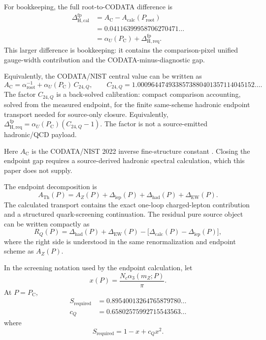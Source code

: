 \documentclass[11pt]{article}
\theoremstyle{remark}
\newcommand{\ATh}{A_{\mathrm{Th}}}
\newcommand{\AZ}{A_Z}
\newcommand{\Ppub}{P_{\mathrm C}}
\newcommand{\Rq}{R_Q}
\newcommand{\Dcalc}{\Delta_{\mathrm{calc}}}
\newcommand{\Dcalib}{\Delta_{\mathrm{H,cal}}}
\newcommand{\Dlep}{\Delta_{\mathrm{lep}}}
\newcommand{\Dhad}{\Delta_{\mathrm{had}}}
\newcommand{\DEW}{\Delta_{\mathrm{EW}}}
\newcommand{\Dhadreq}{\Delta_{\mathrm{H,req}}}
\newcommand{\Nc}{N_c}
\begin{document}
For bookkeeping, the full root-to-CODATA difference is
\begin{align}
\Dcalib^{\mathrm{fp}}
&=
A_{\mathrm C}-A_{\mathrm{calc}}(P_{\mathrm{root}})
\nonumber\\
&=
0.04116399958706270471\ldots
\nonumber\\
&=
\alpha_U(\Ppub)+\Dhadreq^{\mathrm{fp}}.
\label{eq:rootcodatafp}
\end{align}
This larger difference is bookkeeping: it contains the comparison-pixel unified gauge-width
contribution and the CODATA-minus-diagnostic gap.

Equivalently, the CODATA/NIST central value can be written as
\begin{equation}
A_{\mathrm C}
=
\alpha_{\mathrm{root}}^{-1}+\alpha_U(\Ppub)\,C_{24,Q},
\qquad
C_{24,Q}=1.0009644749338573880401357114045152\ldots.
\label{eq:c24qfactor}
\end{equation}
The factor \(C_{24,Q}\) is a back-solved calibration: compact comparison
accounting, solved from the measured endpoint, for the finite same-scheme hadronic endpoint
transport needed for source-only closure. Equivalently,
\(\Dhadreq^{\mathrm{fp}}=\alpha_U(\Ppub)(C_{24,Q}-1)\). The factor is not a source-emitted
hadronic/QCD payload.

Here \(A_{\mathrm C}\) is the CODATA/NIST 2022 inverse fine-structure constant \cite{nist-value,nist-2022}. Closing the endpoint gap requires a source-derived hadronic spectral calculation, which this paper does not supply.

The endpoint decomposition is
\begin{equation}
\ATh(P)
=
\AZ(P)+\Dlep(P)+\Dhad(P)+\DEW(P).
\label{eq:ATsplit}
\end{equation}
The calculated transport contains the exact one-loop charged-lepton contribution and a structured quark-screening continuation. The residual pure source object can be written compactly as
\begin{equation}
\Rq(P)
=
\Dhad(P)+\DEW(P)
-\bigl[\Dcalc(P)-\Dlep(P)\bigr],
\label{eq:RQmeaning}
\end{equation}
where the right side is understood in the same renormalization and endpoint scheme as \(\AZ(P)\).

In the screening notation used by the endpoint calculation, let
\begin{equation}
x(P)=\frac{\Nc\alpha_3(m_Z;P)}{\pi}.
\label{eq:xqcd}
\end{equation}
At \(P=\Ppub\),
\begin{align}
S_{\mathrm{required}}
&=
0.89540013264765879780\ldots
\label{eq:Sreq}\\
c_Q
&=
0.65802575992715543563\ldots
\label{eq:cQ}
\end{align}
where
\begin{equation}
S_{\mathrm{required}}=1-x+c_Qx^2.
\label{eq:cQdef}
\end{equation}
\end{document}
